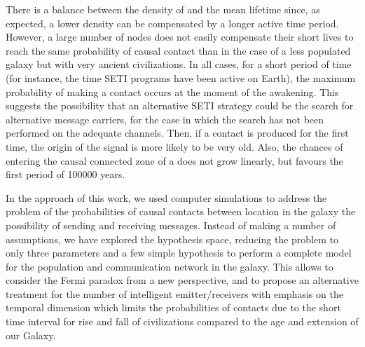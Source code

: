 \documentclass[crop]{CSLB}
\begin{document}

There is a balance between the density of \cetis{} and the mean
lifetime since, as expected, a lower density can be compensated by a
longer active time period.
%
However, a large number of nodes does not easily compensate their
short lives to reach the same probability of causal contact than in
the case of a less populated galaxy but with very ancient
civilizations.
%
In all cases, for a short period of time (for instance, the time SETI
programs have been active on Earth), the maximum probability of making
a contact occurs at the moment of the awakening.
%
This suggests the possibility that an alternative SETI strategy could
be the search for alternative message carriers, for the case in which
the search has not been performed on the adequate channels.
%
Then, if a contact is produced for the first time, the origin of the
signal is more likely to be very old.
%
Also, the chances of entering the causal connected zone of a \ceti{}
does not grow linearly, but favours the first period of 100000 years.






In the approach of this work, we used computer simulations to address
the problem of the probabilities of causal contacts between location
in the galaxy the possibility of sending and receiving messages.
%
Instead of making a number of assumptions, we have explored the
hypothesis space, reducing the problem to only three parameters and a
few simple hypothesis to perform a complete model for the population and
communication network in the galaxy.
%
This allows to consider the Fermi paradox from a new perspective, and
to propose an alternative treatment for the number of intelligent
emitter/receivers with emphasis on the temporal dimension which limits
the probabilities of contacts due to the short time interval for
rise and fall of civilizations compared to the age and extension of
our Galaxy.









\setlength{\bibsep}{0.0pt}


\end{document}
